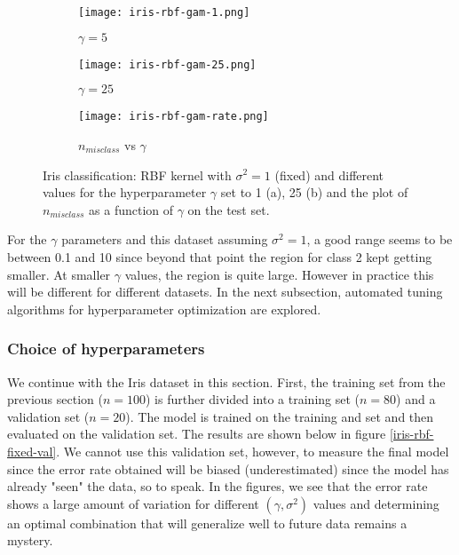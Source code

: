 \documentclass[paper=a4, fontsize=11pt]{scrartcl} %
\numberwithin{equation}{section} %
\begin{document}
\begin{figure}[ht]
\centering
	\begin{subfigure}[b]{0.3\textwidth}
		\centering
		\texttt{[image: iris-rbf-gam-1.png]}
		\caption{$\gamma = 5$}
	\end{subfigure}
	\begin{subfigure}[b]{0.3\textwidth}
		\centering
		\texttt{[image: iris-rbf-gam-25.png]}
		\caption{$\gamma = 25$}
	\end{subfigure}
	\begin{subfigure}[b]{0.3\textwidth}
		\centering
		\texttt{[image: iris-rbf-gam-rate.png]}
		\caption{$n_{misclass}$ vs $\gamma$}
	\end{subfigure}
\caption{Iris classification: RBF kernel with $\sigma^2 = 1$ (fixed) and different values for the hyperparameter $\gamma$ set to 1 (a), 25 (b) and the plot of $n_{misclass}$ as a function of $\gamma$ on the test set.}
\label{iris-rbf-gam}
\end{figure}

For the $\gamma$ parameters and this dataset assuming $\sigma^2 = 1$, a good range seems to be between 0.1 and 10 since beyond that point the region for class 2 kept getting smaller. At smaller $\gamma$ values, the region is quite large. However in practice this will be different for different datasets. In the next subsection, automated tuning algorithms for hyperparameter optimization are explored. 

\subsubsection{Choice of hyperparameters}

We continue with the Iris dataset in this section. First, the training set from the previous section ($n=100$) is further divided into a training set ($n=80$) and a validation set ($n=20$). The model is trained on the training and set and then evaluated on the validation set. The results are shown below in figure \ref{iris-rbf-fixed-val}. We cannot use this validation set, however, to measure the final model since the error rate obtained will be biased (underestimated) since the model has already "seen" the data, so to speak. In the figures, we see that the error rate shows a large amount of variation for different $(\gamma, \sigma^2)$ values and determining an optimal combination that will generalize well to future data remains a mystery.\\
\end{document}
